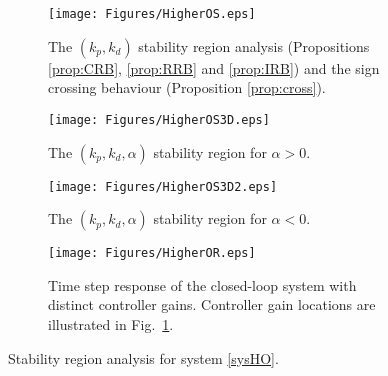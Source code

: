 \documentclass[twoside,reqno,11pt]{fcaa-var} %
\begin{document}
\begin{figure}%
	\centering %
	\begin{subfigure}[b]{0.48\columnwidth}
		\centering
		\texttt{[image: Figures/HigherOS.eps]}
		\caption{The $(k_p,k_d)$ stability region analysis (Propositions \ref{prop:CRB}, \ref{prop:RRB} and \ref{prop:IRB}) and  the sign crossing behaviour (Proposition \ref{prop:cross}).}
		\label{HOstabilitya}
	\end{subfigure}
	\hfill
	\begin{subfigure}[b]{0.48\columnwidth}
		\centering
		\texttt{[image: Figures/HigherOS3D.eps]}
		\caption{The $(k_p,k_d,\alpha)$ stability region for $\alpha>0$.}
		\label{HOstabilityb}
	\end{subfigure}
	\hfill
	\begin{subfigure}[b]{0.48\columnwidth}
		\centering
		\texttt{[image: Figures/HigherOS3D2.eps]}
		\caption{The $(k_p,k_d,\alpha)$ stability region for $\alpha<0$.}
		\label{HOstabilityc}
	\end{subfigure}
	\hfill
\begin{subfigure}[b]{0.48\columnwidth}
	\centering
	\texttt{[image: Figures/HigherOR.eps]}
	\caption{Time step response of the closed-loop system with distinct controller gains. Controller gain locations are illustrated in Fig.~\ref{HOstabilitya}.}\label{HOResponse}
\end{subfigure}
	\caption{Stability region analysis for system \eqref{sysHO}.}\label{HOstability}
\end{figure}
\end{document}
